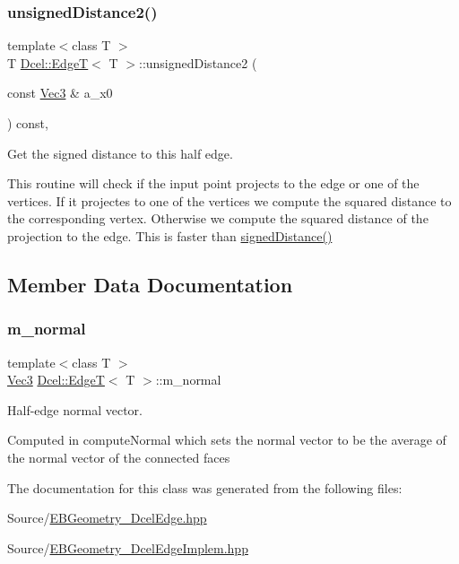 \subsubsection{\texorpdfstring{unsigned\+Distance2()}{unsignedDistance2()}}
{\footnotesize\ttfamily template$<$class T $>$ \\
T \hyperlink{classDcel_1_1EdgeT}{Dcel\+::\+EdgeT}$<$ T $>$\+::unsigned\+Distance2 (\begin{DoxyParamCaption}\item[{const \hyperlink{classDcel_1_1EdgeT_a93b8679cea557c419af44385ca6d356a}{Vec3} \&}]{a\+\_\+x0 }\end{DoxyParamCaption}) const\hspace{0.3cm}{\ttfamily [inline]}, {\ttfamily [noexcept]}}



Get the signed distance to this half edge. 

This routine will check if the input point projects to the edge or one of the vertices. If it projectes to one of the vertices we compute the squared distance to the corresponding vertex. Otherwise we compute the squared distance of the projection to the edge. This is faster than \hyperlink{classDcel_1_1EdgeT_adba2d72aed5f510997d06c2bc9e6e96c}{signed\+Distance()} 

\subsection{Member Data Documentation}
\mbox{\label{classDcel_1_1EdgeT_af44c33f8b5b0a3d45cd4a83e6fde4db5}} 
\subsubsection{\texorpdfstring{m\+\_\+normal}{m\_normal}}
{\footnotesize\ttfamily template$<$class T $>$ \\
\hyperlink{classDcel_1_1EdgeT_a93b8679cea557c419af44385ca6d356a}{Vec3} \hyperlink{classDcel_1_1EdgeT}{Dcel\+::\+EdgeT}$<$ T $>$\+::m\+\_\+normal\hspace{0.3cm}{\ttfamily [protected]}}



Half-\/edge normal vector. 

Computed in compute\+Normal which sets the normal vector to be the average of the normal vector of the connected faces 

The documentation for this class was generated from the following files\+:\begin{DoxyCompactItemize}
\item 
Source/\hyperlink{EBGeometry__DcelEdge_8hpp}{E\+B\+Geometry\+\_\+\+Dcel\+Edge.\+hpp}\item 
Source/\hyperlink{EBGeometry__DcelEdgeImplem_8hpp}{E\+B\+Geometry\+\_\+\+Dcel\+Edge\+Implem.\+hpp}\end{DoxyCompactItemize}
